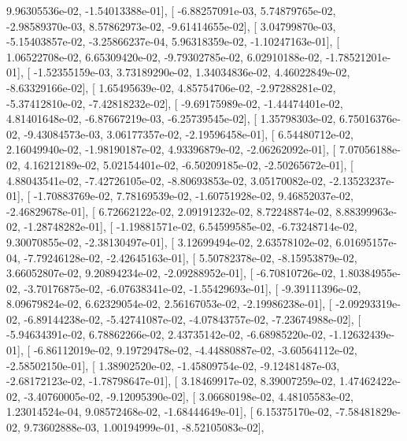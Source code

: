 \documentclass{article}
\begin{document}
          9.96305536e-02,  -1.54013388e-01],
       [ -6.88257091e-03,   5.74879765e-02,  -2.98589370e-03,
          8.57862973e-02,  -9.61414655e-02],
       [  3.04799870e-03,  -5.15403857e-02,  -3.25866237e-04,
          5.96318359e-02,  -1.10247163e-01],
       [  1.06522708e-02,   6.65309420e-02,  -9.79302785e-02,
          6.02910188e-02,  -1.78521201e-01],
       [ -1.52355159e-03,   3.73189290e-02,   1.34034836e-02,
          4.46022849e-02,  -8.63329166e-02],
       [  1.65495639e-02,   4.85754706e-02,  -2.97288281e-02,
         -5.37412810e-02,  -7.42818232e-02],
       [ -9.69175989e-02,  -1.44474401e-02,   4.81401648e-02,
         -6.87667219e-03,  -6.25739545e-02],
       [  1.35798303e-02,   6.75016376e-02,  -9.43084573e-03,
          3.06177357e-02,  -2.19596458e-01],
       [  6.54480712e-02,   2.16049940e-02,  -1.98190187e-02,
          4.93396879e-02,  -2.06262092e-01],
       [  7.07056188e-02,   4.16212189e-02,   5.02154401e-02,
         -6.50209185e-02,  -2.50265672e-01],
       [  4.88043541e-02,  -7.42726105e-02,  -8.80693853e-02,
          3.05170082e-02,  -2.13523237e-01],
       [ -1.70883769e-02,   7.78169539e-02,  -1.60751928e-02,
          9.46852037e-02,  -2.46829678e-01],
       [  6.72662122e-02,   2.09191232e-02,   8.72248874e-02,
          8.88399963e-02,  -1.28748282e-01],
       [ -1.19881571e-02,   6.54599585e-02,  -6.73248714e-02,
          9.30070855e-02,  -2.38130497e-01],
       [  3.12699494e-02,   2.63578102e-02,   6.01695157e-04,
         -7.79246128e-02,  -2.42645163e-01],
       [  5.50782378e-02,  -8.15953879e-02,   3.66052807e-02,
          9.20894234e-02,  -2.09288952e-01],
       [ -6.70810726e-02,   1.80384955e-02,  -3.70176875e-02,
         -6.07638341e-02,  -1.55429693e-01],
       [ -9.39111396e-02,   8.09679824e-02,   6.62329054e-02,
          2.56167053e-02,  -2.19986238e-01],
       [ -2.09293319e-02,  -6.89144238e-02,  -5.42741087e-02,
         -4.07843757e-02,  -7.23674988e-02],
       [ -5.94634391e-02,   6.78862266e-02,   2.43735142e-02,
         -6.68985220e-02,  -1.12632439e-01],
       [ -6.86112019e-02,   9.19729478e-02,  -4.44880887e-02,
         -3.60564112e-02,  -2.58502150e-01],
       [  1.38902520e-02,  -1.45809754e-02,  -9.12481487e-03,
         -2.68172123e-02,  -1.78798647e-01],
       [  3.18469917e-02,   8.39007259e-02,   1.47462422e-02,
         -3.40760005e-02,  -9.12095390e-02],
       [  3.06680198e-02,   4.48105583e-02,   1.23014524e-04,
          9.08572468e-02,  -1.68444649e-01],
       [  6.15375170e-02,  -7.58481829e-02,   9.73602888e-03,
          1.00194999e-01,  -8.52105083e-02],
\end{document}
